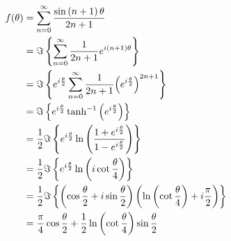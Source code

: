 \item

\begin{align*}
	f(\theta)
	 & = \sum_{n = 0}^\infty \frac{\sin \left(n + 1\right) \theta}{2n + 1}                                                                                                   \\
	 & = \Im \left\{ \sum_{n = 0}^\infty \frac{1}{2n + 1} e^{i (n + 1) \theta} \right\}                                                                                      \\
	 & = \Im \left\{ e^{i \frac{\theta}{2}} \sum_{n = 0}^\infty \frac{1}{2n + 1} {\left( e^{i \frac{\theta}{2}} \right)}^{2n + 1} \right\}                                   \\
	 & = \Im \left\{ e^{i \frac{\theta}{2}} \tanh^{-1} \left( e^{i \frac{\theta}{2}} \right) \right\}                                                                        \\
	 & = \frac{1}{2} \Im \left\{ e^{i \frac{\theta}{2}} \ln \left( \frac{1 + e^{i \frac{\theta}{2}}}{1 - e^{i \frac{\theta}{2}}} \right) \right\}                                  \\
	 & = \frac{1}{2} \Im \left\{ e^{i \frac{\theta}{2}} \ln \left( i \cot \frac{\theta}{4} \right) \right\}                                                                        \\
	 & = \frac{1}{2} \Im \left\{ \left( \cos \frac{\theta}{2} + i \sin \frac{\theta}{2} \right) \left( \ln \left( \cot \frac{\theta}{4} \right) + i \frac{\pi}{2} \right) \right\} \\
	 & = \frac{\pi}{4} \cos \frac{\theta}{2} + \frac{1}{2} \ln \left( \cot \frac{\theta}{4} \right) \sin \frac{\theta}{2}
\end{align*}

